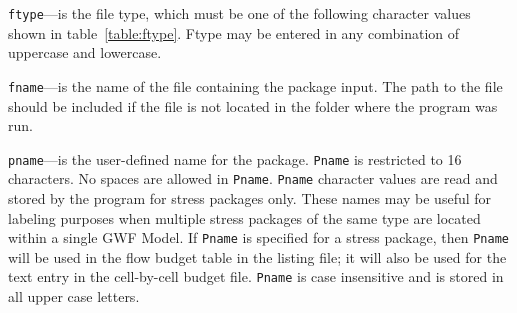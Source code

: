 \begin{description}
\item \texttt{ftype}---is the file type, which must be one of the following character values shown in table~\ref{table:ftype}. Ftype may be entered in any combination of uppercase and lowercase.

\item \texttt{fname}---is the name of the file containing the package input.  The path to the file should be included if the file is not located in the folder where the program was run.

\item \texttt{pname}---is the user-defined name for the package.  \texttt{Pname} is restricted to 16 characters.  No spaces are allowed in \texttt{Pname}.  \texttt{Pname} character values are read and stored by the program for stress packages only.  These names may be useful for labeling purposes when multiple stress packages of the same type are located within a single GWF Model.  If \texttt{Pname} is specified for a stress package, then \texttt{Pname} will be used in the flow budget table in the listing file; it will also be used for the text entry in the cell-by-cell budget file.  \texttt{Pname} is case insensitive and is stored in all upper case letters.

\end{description}

